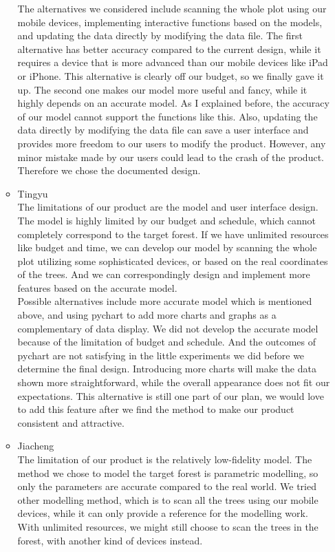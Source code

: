 \documentclass[12pt, titlepage]{article}
\begin{document}
\begin{enumerate}
\begin{itemize}
    The alternatives we considered include scanning the whole plot using our mobile devices, implementing interactive functions based on the models, and updating the data directly by modifying the data file. The first alternative has better accuracy compared to the current design, while it requires a device that is more advanced than our mobile devices like iPad or iPhone. This alternative is clearly off our budget, so we finally gave it up. The second one makes our model more useful and fancy, while it highly depends on an accurate  model. As I explained before, the accuracy of our model cannot support the functions like this. Also, updating the data directly by modifying the data file can save a user interface and provides more freedom to our users to modify the product. However, any minor mistake made by our users could lead to the crash of the product. Therefore we chose the documented design. \\
    \item Tingyu\\
The limitations of our product are the model and user interface design. The model is highly limited by our budget and schedule, which cannot completely correspond to the target forest. If we have unlimited resources like budget and time, we can develop our model by scanning the whole plot utilizing some sophisticated devices, or based on the real coordinates of the trees. And we can correspondingly design and implement more features based on the accurate model. \\

Possible alternatives include more accurate model which is mentioned above, and using pychart to add more charts and graphs as a complementary of data display. We did not develop the accurate model because of the limitation of budget and schedule. And the outcomes of pychart are not satisfying in the little experiments we did before we determine the final design. Introducing more charts will make the data shown more straightforward, while the overall appearance does not fit our expectations. This alternative is still one part of our plan, we would love to add this feature after we find the method to make our product consistent and attractive. \\
    
    \item Jiacheng\\
The limitation of our product is the relatively low-fidelity model. The method we chose to model the target forest is parametric modelling, so only the parameters are accurate compared to the real world. We tried other modelling method, which is to scan all the trees using our mobile devices, while it can only provide a reference for the modelling work. With unlimited resources, we might still choose to scan the trees in the forest, with another kind of devices instead. 


\end{itemize}
\end{enumerate}
\end{document}
